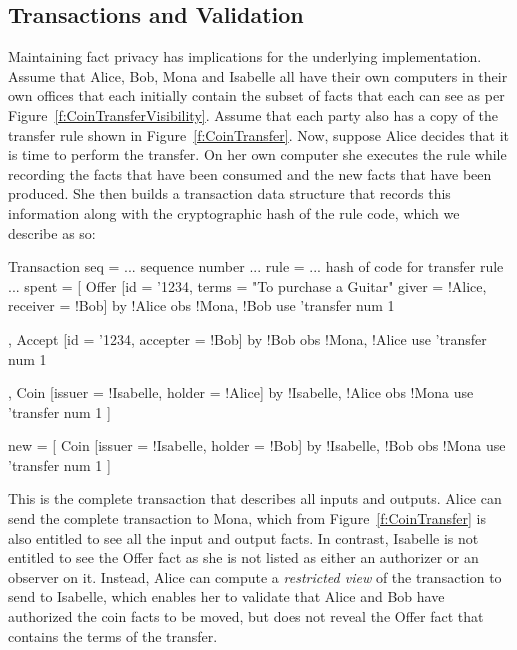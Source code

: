 \subsection{Transactions and Validation}
\label{s:Transactions}
Maintaining fact privacy has implications for the underlying implementation. Assume that Alice, Bob, Mona and Isabelle all have their own computers in their own offices that each initially contain the subset of facts that each can see as per Figure~\ref{f:CoinTransferVisibility}. Assume that each party also has a copy of the transfer rule shown in Figure~\ref{f:CoinTransfer}. Now, suppose Alice decides that it is time to perform the transfer. On her own computer she executes the rule while recording the facts that have been consumed and the new facts that have been produced. She then builds a transaction data structure that records this information along with the cryptographic hash of the rule code, which we describe as so:

\begin{small}
\begin{code}
Transaction
 seq   = ... sequence number ...
 rule  = ... hash of code for transfer rule ...
 spent = [ Offer [id = '1234, terms = "To purchase a Guitar"
                  giver = !Alice, receiver = !Bob]
           by  {!Alice}            obs {!Mona, !Bob}
           use {'transfer}         num   1

         , Accept [id = '1234, accepter = !Bob]
           by  {!Bob}              obs {!Mona, !Alice}
           use {'transfer}         num 1

         , Coin   [issuer = !Isabelle, holder = !Alice]
           by  {!Isabelle, !Alice} obs {!Mona}
           use {'transfer}         num 1 ]

 new   = [ Coin   [issuer = !Isabelle, holder = !Bob]
           by  {!Isabelle, !Bob}   obs {!Mona}
           use {'transfer}         num 1 ]
\end{code}
\end{small}

This is the complete transaction that describes all inputs and outputs. Alice can send the complete transaction to Mona, which from Figure~\ref{f:CoinTransfer} is also entitled to see all the input and output facts. In contrast, Isabelle is not entitled to see the Offer fact as she is not listed as either an authorizer or an observer on it. Instead, Alice can compute a \emph{restricted view} of the transaction to send to Isabelle, which enables her to validate that Alice and Bob have authorized the coin facts to be moved, but does not reveal the Offer fact that contains the terms of the transfer.


